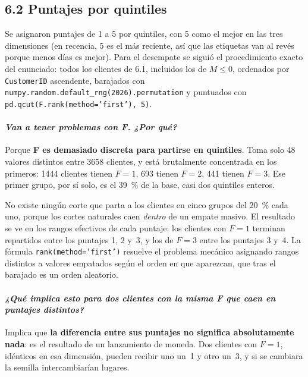 \documentclass[11pt]{article}
\begin{document}
\subsection{6.2 Puntajes por quintiles}

Se asignaron puntajes de 1 a 5 por quintiles, con 5 como el mejor en las
tres dimensiones (en recencia, 5 es el m\'as reciente, as\'i que las
etiquetas van al rev\'es porque menos d\'ias es mejor). Para el desempate se
sigui\'o el procedimiento exacto del enunciado: todos los clientes de 6.1,
incluidos los de $M \le 0$, ordenados por \texttt{CustomerID} ascendente,
barajados con \texttt{numpy.random.default\_rng(2026).permutation} y
puntuados con \texttt{pd.qcut(F.rank(method='first'), 5)}.

\paragraph{{\normalfont\itshape Van a tener problemas con F. ¿Por qu\'e?}}
Porque \textbf{F es demasiado discreta para partirse en quintiles}. Toma
solo \num{48} valores distintos entre \num{3658} clientes, y est\'a
brutalmente concentrada en los primeros: \num{1444} clientes tienen $F=1$,
\num{693} tienen $F=2$, \num{441} tienen $F=3$. Ese primer grupo, por s\'i
solo, es el \SI{39}{\percent} de la base, casi dos quintiles enteros.

No existe ning\'un corte que parta a los clientes en cinco grupos del
\SI{20}{\percent} cada uno, porque los cortes naturales caen \emph{dentro} de
un empate masivo. El resultado se ve en los rangos efectivos de cada
puntaje: los clientes con $F=1$ terminan repartidos entre los puntajes
\num{1}, \num{2} y~\num{3}, y los de $F=3$ entre los puntajes \num{3} y~\num{4}.
La f\'ormula \texttt{rank(method='first')} resuelve el problema mec\'anico
asignando rangos distintos a valores empatados seg\'un el orden en que
aparezcan, que tras el barajado es un orden aleatorio.

\paragraph{{\normalfont\itshape ¿Qu\'e implica esto para dos clientes con la
misma F que caen en puntajes distintos?}} Implica que \textbf{la diferencia
entre sus puntajes no significa absolutamente nada}: es el resultado de un
lanzamiento de moneda. Dos clientes con $F=1$, id\'enticos en esa dimensi\'on,
pueden recibir uno un~\num{1} y otro un~\num{3}, y si se cambiara la semilla
intercambiar\'ian lugares.
\end{document}

